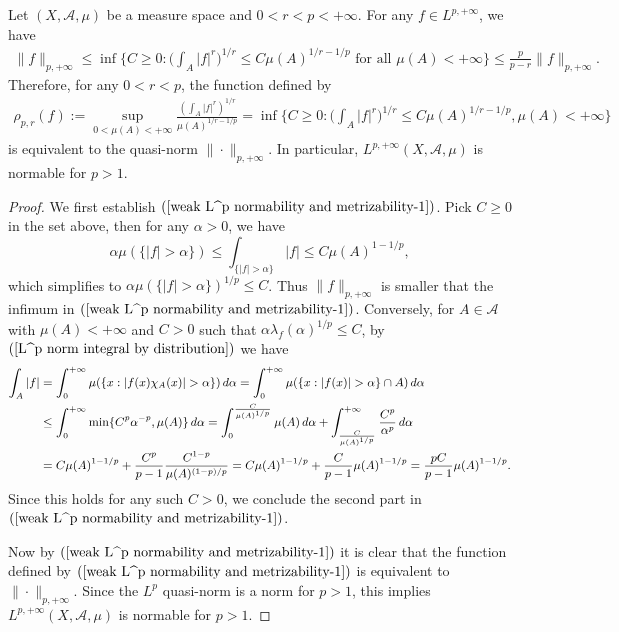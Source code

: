 \begin{proposition}\label{weak L^p normability and metrizability}
Let $(X,\mathcal{A},\mu)$ be a measure space and $0<r<p<+\infty$. For any $f\in L^{p,+\infty}$, we have
\begin{align}\label{weak L^p normability and metrizability-1}
\|f\|_{p,+\infty}\leq\inf\Big\{C\geq 0:\Big(\int_A|f|^r\Big)^{1/r}\leq C\mu(A)^{1/r-1/p}\text{ for all $\mu(A)<+\infty$}\Big\}\leq\frac{p}{p-r}\|f\|_{p,+\infty}.
\end{align}
Therefore, for any $0<r<p$, the function defined by
\begin{align}\label{weak L^p normability and metrizability-2}
\rho_{p,r}(f):=\sup_{0<\mu(A)<+\infty}\frac{(\int_A|f|^r)^{1/r}}{\mu(A)^{1/r-1/p}}=\inf\Big\{C\geq 0:\Big(\int_A|f|^r\Big)^{1/r}\leq C\mu(A)^{1/r-1/p},\mu(A)<+\infty\Big\}
\end{align}
is equivalent to the quasi-norm $\|\cdot\|_{p,+\infty}$. In particular, $L^{p,+\infty}(X,\mathcal{A},\mu)$ is normable for $p>1$.
\end{proposition}
\begin{proof}
We first establish $(\ref{weak L^p normability and metrizability-1})$. Pick $C\geq 0$ in the set above, then for any $\alpha>0$, we have
\[\alpha\mu(\{|f|>\alpha\})\leq\int_{\{|f|>\alpha\}}|f|\leq C\mu(A)^{1-1/p},\]
which simplifies to $\alpha\mu(\{|f|>\alpha\})^{1/p}\leq C$. Thus $\|f\|_{p,+\infty}$ is smaller that the infimum in $(\ref{weak L^p normability and metrizability-1})$. Conversely, for $A\in\mathcal{A}$ with $\mu(A)<+\infty$ and $C>0$ such that $\alpha\lambda_f(\alpha)^{1/p}\leq C$, by $(\ref{L^p norm integral by distribution})$ we have
\begin{equation*}\small
\begin{aligned}
\int_A|f|&=\int_{0}^{+\infty}\mu(\{x:|f(x)\chi_A(x)|>\alpha\})\,d\alpha=\int_{0}^{+\infty}\mu(\{x:|f(x)|>\alpha\}\cap A)\,d\alpha\\
&\leq\int_{0}^{+\infty}\min\{C^p\alpha^{-p},\mu(A)\}\,d\alpha=\int_{0}^{\frac{C}{\mu(A)^{1/p}}}\mu(A)\,d\alpha+\int_{\frac{C}{\mu(A)^{1/p}}}^{+\infty}\frac{C^p}{\alpha^p}\,d\alpha\\
&=C\mu(A)^{1-1/p}+\frac{C^p}{p-1}\frac{C^{1-p}}{\mu(A)^{(1-p)/p}}=C\mu(A)^{1-1/p}+\frac{C}{p-1}\mu(A)^{1-1/p}=\frac{pC}{p-1}\mu(A)^{1-1/p}.
\end{aligned}
\end{equation*}
Since this holds for any such $C>0$, we conclude the second part in $(\ref{weak L^p normability and metrizability-1})$.\par
Now by $(\ref{weak L^p normability and metrizability-1})$ it is clear that the function defined by $(\ref{weak L^p normability and metrizability-1})$ is equivalent to $\|\cdot\|_{p,+\infty}$. Since the $L^p$ quasi-norm is a norm for $p>1$, this implies $L^{p,+\infty}(X,\mathcal{A},\mu)$ is normable for $p>1$.
\end{proof}
